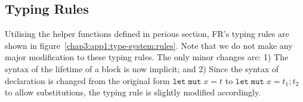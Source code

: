 \begin{subappendices}
\subsection{Typing Rules}
Utilising the helper functions defined in perious section, FR's typing rules are shown in figure~\ref{chap3:app1:type-system:rules}. Note that we do not make any major modification to these typing rules. The only minor changes are: 1) The syntax of the lifetime of a block is now implicit; and 2) Since the syntax of declaration is changed from the original form $\texttt{let}\;\texttt{mut}\; x = t$ to $\texttt{let}\;\texttt{mut}\; x = t_1;t_2$ to allow substitutions, the typing rule is slightly modified accordingly.
\end{subappendices}